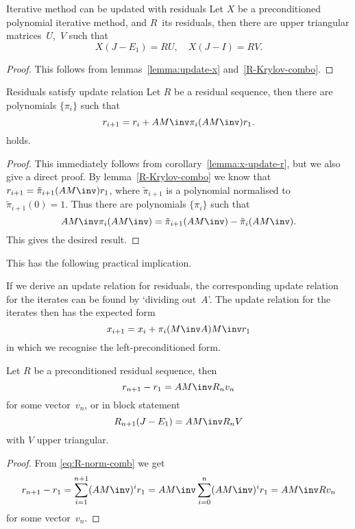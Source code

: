 \begin{precond}
\begin{ccorollary}{Iterative method can be updated with residuals}
\label{lemma:x-update-r}
Let $X$ be a preconditioned polynomial iterative method, and $R$~its
residuals, then there are upper triangular matrices~$U$,~$V$ such that
\[ X(J-E_1)=RU,\quad X(J-I)=RV. \]
\end{ccorollary}
\begin{proof}
This follows from lemmas~\ref{lemma:update-x}
and~\ref{R-Krylov-combo}.
\end{proof}

\begin{llemma}{Residuals satisfy update relation}
Let $R$ be a residual sequence, then there are polynomials $\{\pi_i\}$
such that
\begin{equation} r_{i+1}=r_i+AM\inv \pi_i(AM\inv)r_1.
    \label{eq:r-update-abstract}\end{equation}
holds.
\end{llemma}
\begin{proof}
This immediately follows from corollary~\ref{lemma:x-update-r}, but we
also give a direct proof. By lemma~\ref{R-Krylov-combo} we know that
$r_{i+1}=\tilde\pi_{i+1}(AM\inv )r_1$,
where $\tilde\pi_{i+1}$ is a polynomial normalised to $\tilde\pi_{i+1}(0)=1$.
Thus there are polynomials $\{\pi_i\}$ such that
\[ AM\inv\pi_i(AM\inv)=\tilde\pi_{i+1}(AM\inv)-\tilde\pi_i(AM\inv). \]
This gives the desired result.
\end{proof}

This has the following practical implication.
\begin{remark}
If we derive an update relation for residuals,
the corresponding update relation for the iterates can
be found by `dividing out~$A$'. The update relation for the iterates
then has the expected form
\[ x_{i+1}=x_i+\pi_i(M\inv A)M\inv r_1 \]
in which we recognise the left-preconditioned form.
\end{remark}

\begin{corollary}
Let $R$ be a preconditioned residual sequence, then
\begin{equation} r_{n+1}-r_1=AM\inv R_nv_n
    \label{eq:r-update-combo}\end{equation}
for some vector~$v_n$, or in block statement
\begin{equation} R_{n+1}(J-E_1)=AM\inv R_nV
    \label{eq:hess-foreshadow}\end{equation}
with $V$ upper triangular.
\end{corollary}
\begin{proof}
From \eqref{eq:R-norm-comb} we get
\[
r_{n+1}-r_1=\sum_{i=1}^{n+1}(AM\inv)^ir_1
    =AM\inv\sum_{i=0}^n(AM\inv)^ir_1=AM\inv Rv_n \]
for some vector~$v_n$.
\end{proof}
\end{precond}

